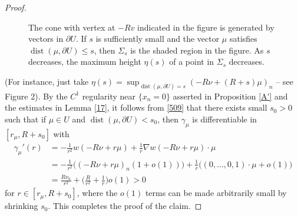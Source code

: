 \documentclass[12pt]{article}
\numberwithin{equation}{section}
\theoremstyle{plain}
\theoremstyle{definition}
\begin{document}
\begin{proof}
\begin{figure}
		\vspace*{-10mm}\caption{\small{The cone with vertex at $-Rv$ indicated in the figure is generated by vectors in $\partial U$. If $s$ is sufficiently small and the vector $\mu$ satisfies $\operatorname{dist}(\mu,\partial U)\leq s$, then $\Sigma_s$ is the shaded region in the figure. As $s$ decreases, the maximum height $\eta(s)$ of a point in $\Sigma_s$ decreases.}}
	\end{figure}


\noindent (For instance, just take $\eta(s) = \sup_{\operatorname{dist}(\mu,\partial U)=s}(-R\nu+(R+s)\mu)_n$ -- see Figure 2). By the $C^1$ regularity near $\{x_n=0\}$ asserted in Proposition \ref{A'} and the estimates in Lemma \ref{17}, it follows from \eqref{509} that there exists small $s_0>0$ such that if $\mu\in U$ and $\operatorname{dist}(\mu,\partial U)<s_0$, then $\gamma_\mu$ is differentiable in $[r_\mu, R+s_0]$ with
	\begin{align*}
	\gamma_\mu'(r) & = -\frac{1}{r^2}w(-R\nu +r\mu) + \frac{1}{r}\nabla w(-R\nu +r\mu)\cdot \mu \nonumber \\
	& = -\frac{1}{r^2}\Big((-R\nu +r\mu)_n(1 + o(1))\Big) + \frac{1}{r}\Big((0,\dots,0,1)\cdot \mu + o(1)\Big) \nonumber \\
	& = \frac{R\nu_n}{r^2} + \bigg(\frac{R}{r^2} + \frac{1}{r}\bigg)o(1)>0
	\end{align*}
	for $r\in[r_\mu, R+s_0]$, where the $o(1)$ terms can be made arbitrarily small by shrinking $s_0$. This completes the proof of the claim.\medskip 
	

\end{proof}
\end{document}
